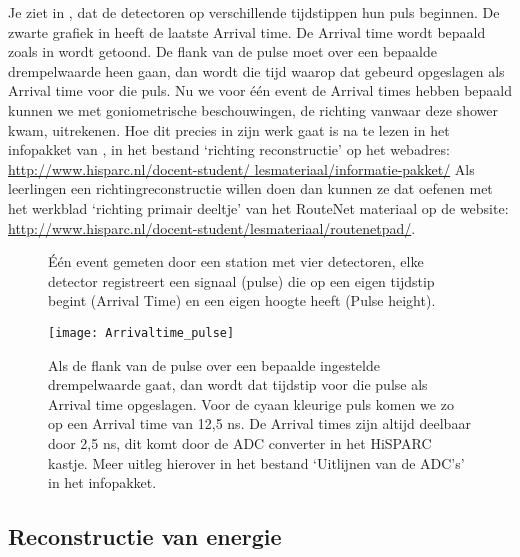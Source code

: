 Je ziet in , dat de detectoren op
verschillende tijdstippen hun puls beginnen. De zwarte grafiek in
 heeft de laatste Arrival time. De Arrival
time wordt bepaald zoals in  wordt getoond.
De flank van de pulse moet over een bepaalde drempelwaarde heen gaan,
dan wordt die tijd waarop dat gebeurd opgeslagen als Arrival time voor
die puls. Nu we voor één event de Arrival times hebben bepaald kunnen we
met goniometrische beschouwingen, de richting vanwaar deze shower kwam, uitrekenen.
Hoe dit precies in zijn werk gaat is na te lezen in het infopakket van
\hisparc, in het bestand `richting reconstructie' op het webadres:
\url{http://www.hisparc.nl/docent-student/
lesmateriaal/informatie-pakket/} Als leerlingen een richtingreconstructie willen doen
dan kunnen ze dat oefenen met het werkblad `richting primair deeltje' van het RouteNet
materiaal op de website: \url{http://www.hisparc.nl/docent-student/lesmateriaal/routenetpad/}.

\begin{figure}
    \centering
    
    \caption{Één event gemeten door een station met vier detectoren, elke detector registreert
    een signaal (pulse) die op een eigen tijdstip begint (Arrival Time) en een eigen hoogte heeft
    (Pulse height).}
    \label{fig:traces}
\end{figure}


\begin{figure}
    \centering
    \texttt{[image: Arrivaltime\_pulse]}
    \caption{Als de flank van de pulse over een bepaalde ingestelde
    drempelwaarde gaat, dan wordt dat tijdstip voor die pulse als Arrival
    time opgeslagen. Voor de cyaan kleurige puls komen we zo op een Arrival
    time van 12,5 ns. De Arrival times zijn altijd deelbaar door 2,5 ns, dit
    komt door de ADC converter in het HiSPARC kastje. Meer uitleg hierover
    in het bestand `Uitlijnen van de ADC's' in het \hisparc infopakket.}
    \label{fig:Arrivaltime_pulse}
\end{figure}


\subsection{Reconstructie van energie }

